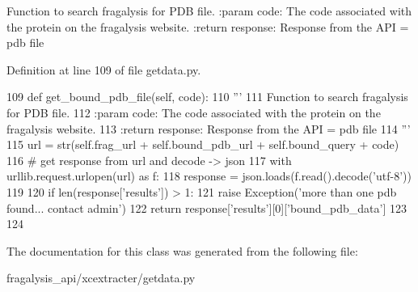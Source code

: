 \begin{DoxyVerb}Function to search fragalysis for PDB file.
:param code: The code associated with the protein on the fragalysis website.
:return response: Response from the API = pdb file
\end{DoxyVerb}
 

Definition at line 109 of file getdata.\+py.


\begin{DoxyCode}
109     \textcolor{keyword}{def }get\_bound\_pdb\_file(self, code):
110         \textcolor{stringliteral}{'''}
111 \textcolor{stringliteral}{        Function to search fragalysis for PDB file.}
112 \textcolor{stringliteral}{        :param code: The code associated with the protein on the fragalysis website.}
113 \textcolor{stringliteral}{        :return response: Response from the API = pdb file}
114 \textcolor{stringliteral}{        '''}
115         url = str(self.frag\_url + self.bound\_pdb\_url + self.bound\_query + code)
116         \textcolor{comment}{# get response from url and decode -> json}
117         with urllib.request.urlopen(url) \textcolor{keyword}{as} f:
118             response = json.loads(f.read().decode(\textcolor{stringliteral}{'utf-8'}))
119 
120         \textcolor{keywordflow}{if} len(response[\textcolor{stringliteral}{'results'}]) > 1:
121             \textcolor{keywordflow}{raise} Exception(\textcolor{stringliteral}{'more than one pdb found... contact admin'})
122         \textcolor{keywordflow}{return} response[\textcolor{stringliteral}{'results'}][0][\textcolor{stringliteral}{'bound\_pdb\_data'}]
123 
124 
\end{DoxyCode}


The documentation for this class was generated from the following file\+:\begin{DoxyCompactItemize}
\item 
fragalysis\+\_\+api/xcextracter/getdata.\+py\end{DoxyCompactItemize}
